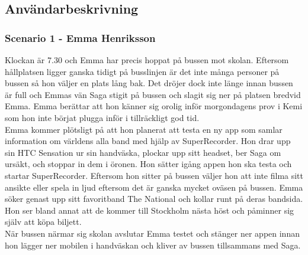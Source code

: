 \subsection{Användarbeskrivning}
\subsubsection{Scenario 1 - Emma Henriksson}
Klockan är 7.30 och Emma har precis hoppat på bussen mot skolan. Eftersom hållplatsen ligger ganska tidigt på busslinjen är det inte många personer på bussen så hon väljer en plats lång bak. Det dröjer dock inte länge innan bussen är full och Emmas vän Saga stigit på bussen och slagit sig ner på platsen bredvid Emma. Emma berättar att hon känner sig orolig inför morgondagens prov i Kemi som hon inte börjat plugga inför i tillräckligt god tid.\\

Emma kommer plötsligt på att hon planerat att testa en ny app som samlar information om världens alla band med hjälp av SuperRecorder. Hon drar upp sin HTC Sensation ur sin handväska, plockar upp sitt headset, ber Saga om ursäkt, och stoppar in dem i öronen. Hon sätter igång appen hon ska testa och startar SuperRecorder. Eftersom hon sitter på bussen väljer hon att inte filma sitt ansikte eller spela in ljud eftersom det är ganska mycket oväsen på bussen. Emma söker genast upp sitt favoritband The National och kollar runt på deras bandsida. Hon ser bland annat att de kommer till Stockholm nästa höst och påminner sig själv att köpa biljett.\\

När bussen närmar sig skolan avslutar Emma testet och stänger ner appen innan hon lägger ner mobilen i handväskan och kliver av bussen tillsammans med Saga.